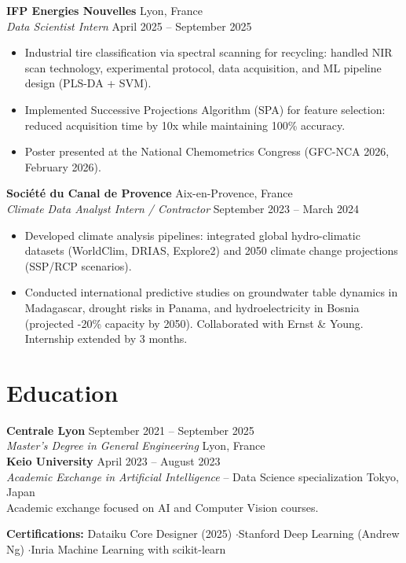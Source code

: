 \documentclass[10pt, a4paper]{article}
\begin{document}
\textbf{IFP Energies Nouvelles} \hfill Lyon, France\\
\textit{Data Scientist Intern} \hfill \small April 2025 -- September 2025
\begin{itemize}
    \item Industrial tire classification via spectral scanning for recycling: handled NIR scan technology, experimental protocol, data acquisition, and ML pipeline design (PLS-DA + SVM).
    \item Implemented Successive Projections Algorithm (SPA) for feature selection: reduced acquisition time by 10x while maintaining 100\% accuracy.
    \item Poster presented at the National Chemometrics Congress (GFC-NCA 2026, February 2026).
\end{itemize}

\textbf{Société du Canal de Provence} \hfill Aix-en-Provence, France\\
\textit{Climate Data Analyst Intern / Contractor} \hfill \small September 2023 -- March 2024
\begin{itemize}
    \item Developed climate analysis pipelines: integrated global hydro-climatic datasets (WorldClim, DRIAS, Explore2) and 2050 climate change projections (SSP/RCP scenarios).
    \item Conducted international predictive studies on groundwater table dynamics in Madagascar, drought risks in Panama, and hydroelectricity in Bosnia (projected -20\% capacity by 2050). Collaborated with Ernst \& Young. Internship extended by 3 months.
\end{itemize}

\section{Education}

\textbf{Centrale Lyon} \hfill September 2021 -- September 2025\\
\textit{Master's Degree in General Engineering} \hfill Lyon, France\\[2pt]
\textbf{Keio University} \hfill April 2023 -- August 2023\\
\textit{Academic Exchange in Artificial Intelligence} -- Data Science specialization \hfill Tokyo, Japan\\
\small Academic exchange focused on AI and Computer Vision courses.

\vspace{2pt}
\noindent\textbf{Certifications:} Dataiku Core Designer (2025) \quad$\cdot$\quad Stanford Deep Learning (Andrew Ng) \quad$\cdot$\quad Inria Machine Learning with scikit-learn
\end{document}
